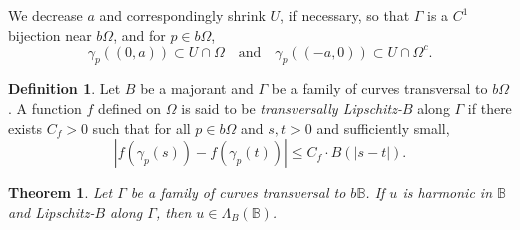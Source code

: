 \documentclass[12pt,a4paper]{amsart}
\numberwithin{equation}{section}
\newtheorem{theorem}[equation]{Theorem}
\theoremstyle{definition}
\newtheorem{definition}[equation]{Definition}
\begin{document}
We decrease $a$ and correspondingly shrink $U$, if necessary, so that $\Gamma$ is a $C^1$ bijection near $b\Omega$, and for $p\in b\Omega$, 
\[\gamma_p((0,a)) \subset U\cap \Omega \quad\text{and}\quad \gamma_p((-a,0)) \subset U\cap \Omega^c.\]
\begin{definition} Let $B$ be a majorant and $\Gamma$ be a family of curves transversal to $b\Omega$. A function $f$ defined on $\Omega$ is said to be \textit{transversally Lipschitz-$B$} along $\Gamma$ if there exists $C_f > 0$ such that for all $p\in b\Omega$ and $s,t>0$ and sufficiently small,
\[{\left\lvert{f(\gamma_p(s))-f(\gamma_p(t))}\right\rvert} \le C_f\cdot B({\left\lvert{s-t}\right\rvert}).\]
\end{definition}

\begin{theorem}\label{thm:TransLipBall}
Let $\Gamma$ be a family of curves transversal to $b\mathbb{B}$. If $u$ is harmonic in $\mathbb{B}$ and Lipschitz-$B$ along $\Gamma$, then $u\in\Lambda_B(\mathbb{B})$.
\end{theorem}
\end{document}
